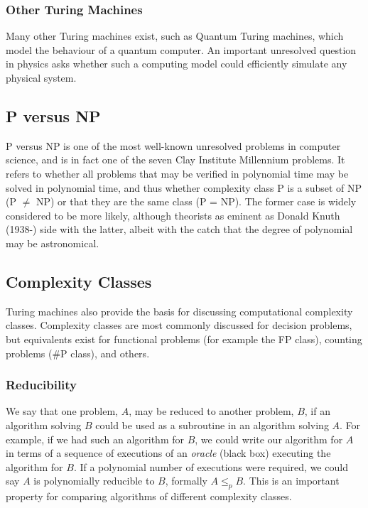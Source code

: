 \documentclass[11pt]{amsart}
\begin{document}
\subsubsection{Other Turing Machines}

Many other Turing machines exist, such as Quantum Turing machines, which model the behaviour of a quantum computer. An important unresolved question in physics asks whether such a computing model could efficiently simulate any physical system.

\subsection{P versus NP}

P versus NP is one of the most well-known unresolved problems in computer science, and is in fact one of the seven Clay Institute Millennium problems. It refers to whether all problems that may be verified in polynomial time may be solved in polynomial time, and thus whether complexity class P is a subset of NP (P $\neq$ NP) or that they are the same class (P = NP). The former case is widely considered to be more likely, although theorists as eminent as Donald Knuth (1938-) side with the latter, albeit with the catch that the degree of polynomial may be astronomical.

\subsection{Complexity Classes}

Turing machines also provide the basis for discussing computational complexity classes. Complexity classes are most commonly discussed for decision problems, but equivalents exist for functional problems (for example the FP class), counting problems (\#P class), and others.

\subsubsection{Reducibility}

We say that one problem, $A$, may be reduced to another problem, $B$, if an algorithm solving $B$ could be used as a subroutine in an algorithm solving $A$. For example, if we had such an algorithm for $B$, we could write our algorithm for $A$ in terms of a sequence of executions of an \emph{oracle} (black box) executing the algorithm for $B$. If a polynomial number of executions were required, we could say $A$ is polynomially reducible to $B$, formally $A \leq_p B.$ This is an important property for comparing algorithms of different complexity classes.
\end{document}
